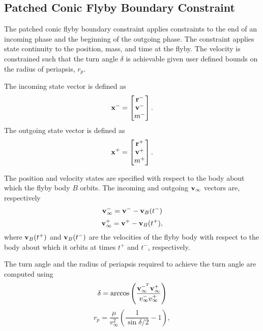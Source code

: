 \subsection{Patched Conic Flyby Boundary Constraint}

The patched conic flyby boundary constraint applies constraints to the end of an incoming phase and the beginning of the outgoing phase. The constraint applies state continuity to the position, mass, and time at the flyby.  The velocity is constrained such that the turn angle $\delta$ is achievable given user defined bounds on the radius of periapsis, $r_p$.      

The incoming state vector is defined as 
\begin{equation}
 \mathbf{x}^- = 
 \begin{bmatrix}
    \mathbf{r}^-\\
    \mathbf{v}^-\\
    m^-
 \end{bmatrix}.
\end{equation}
%
The outgoing state vector is defined as 
%
\begin{equation}
 \mathbf{x}^+ = 
 \begin{bmatrix}
    \mathbf{r}^+\\
    \mathbf{v}^+\\
    m^+
 \end{bmatrix}.
\end{equation}

The position and velocity states are specified with respect to the body about which the flyby body $B$ orbits.
%
The incoming and outgoing $\mathbf{v}_{\infty}$ vectors are, respectively
%
\begin{equation}
 \mathbf{v}_{\infty}^- = \mathbf{v}^- - \mathbf{v}_B(t^-)
\end{equation}
%  
\begin{equation}
 \mathbf{v}_{\infty}^+ = \mathbf{v}^+ - \mathbf{v}_B(t^+),
\end{equation}
%
where $\mathbf{v}_B(t^+)$ and $\mathbf{v}_B(t^-)$ are the velocities of the flyby body with respect to the body about which it orbits at times $t^+$ and $t^-$, respectively.

The turn angle and the radius of periapsis required to achieve the turn angle are computed using
%
\begin{equation}
    \delta = \arccos{{ \left(\frac{\mathbf{v}_{\infty}^{-^T} \mathbf{v}_{\infty}^{+}}{v_{\infty}^{-}v_{\infty}^{+}}\right)}}
\end{equation}
%
\begin{equation}
r_p = \frac{\mu}{v_{\infty}^{2}} \left(\frac{1}{\sin{\delta/2}} -1\right),
\end{equation}

